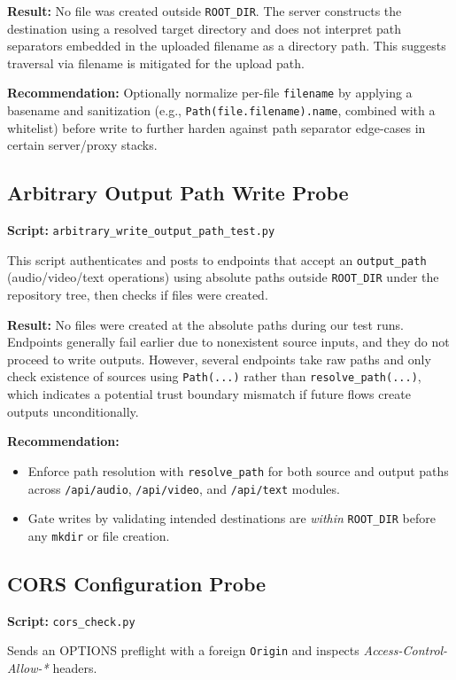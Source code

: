 \documentclass{article}
\begin{document}
\textbf{Result:} No file was created outside \texttt{ROOT\_DIR}. The server constructs the destination using a resolved target directory and does not interpret path separators embedded in the uploaded filename as a directory path. This suggests traversal via filename is mitigated for the upload path.

\textbf{Recommendation:} Optionally normalize per-file \texttt{filename} by applying a basename and sanitization (e.g., \texttt{Path(file.filename).name}, combined with a whitelist) before write to further harden against path separator edge-cases in certain server/proxy stacks.

\subsection{Arbitrary Output Path Write Probe}
\textbf{Script:} \texttt{arbitrary\_write\_output\_path\_test.py}

This script authenticates and posts to endpoints that accept an \texttt{output\_path} (audio/video/text operations) using absolute paths outside \texttt{ROOT\_DIR} under the repository tree, then checks if files were created.

\textbf{Result:} No files were created at the absolute paths during our test runs. Endpoints generally fail earlier due to nonexistent source inputs, and they do not proceed to write outputs. However, several endpoints take raw paths and only check existence of sources using \texttt{Path(...)} rather than \texttt{resolve\_path(...)}, which indicates a potential trust boundary mismatch if future flows create outputs unconditionally.

\textbf{Recommendation:}
\begin{itemize}
  \item Enforce path resolution with \texttt{resolve\_path} for both source and output paths across \texttt{/api/audio}, \texttt{/api/video}, and \texttt{/api/text} modules.
  \item Gate writes by validating intended destinations are \emph{within} \texttt{ROOT\_DIR} before any \texttt{mkdir} or file creation.
\end{itemize}

\subsection{CORS Configuration Probe}
\textbf{Script:} \texttt{cors\_check.py}

Sends an OPTIONS preflight with a foreign \texttt{Origin} and inspects \textit{Access-Control-Allow-*} headers.
\end{document}
